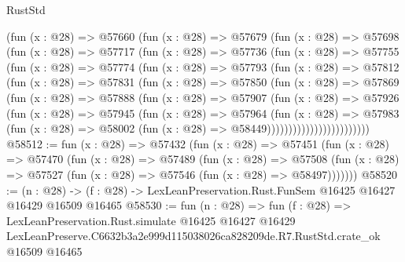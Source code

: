 \begin{lexlean}{RustStd}
\begin{coremodule}
            (fun (x : @28) =>
            @57660
              (fun (x : @28) =>
              @57679
                (fun (x : @28) =>
                @57698
                  (fun (x : @28) =>
                  @57717
                    (fun (x : @28) =>
                    @57736
                      (fun (x : @28) =>
                      @57755
                        (fun (x : @28) =>
                        @57774
                          (fun (x : @28) =>
                          @57793
                            (fun (x : @28) =>
                            @57812
                              (fun (x : @28) =>
                              @57831
                                (fun (x : @28) =>
                                @57850
                                  (fun (x : @28) =>
                                  @57869
                                    (fun (x : @28) =>
                                    @57888
                                      (fun (x : @28) =>
                                      @57907
                                        (fun (x : @28) =>
                                        @57926
                                          (fun (x : @28) =>
                                          @57945
                                            (fun (x : @28) =>
                                            @57964
                                              (fun (x : @28) =>
                                              @57983
                                                (fun (x : @28) =>
                                                @58002
                                                  (fun (x : @28) => @58449))))))))))))))))))))))))
@58512 := fun (x : @28) =>
  @57432
    (fun (x : @28) =>
    @57451
      (fun (x : @28) =>
      @57470
        (fun (x : @28) =>
        @57489
          (fun (x : @28) =>
          @57508 (fun (x : @28) => @57527 (fun (x : @28) => @57546 (fun (x : @28) => @58497)))))))
@58520 := (n : @28) ->
  (f : @28) -> LexLeanPreservation.Rust.FunSem @16425 @16427 @16429 @16509 @16465
@58530 := fun (n : @28) =>
  fun (f : @28) =>
  LexLeanPreservation.Rust.simulate
    @16425
    @16427
    @16429
    LexLeanPreserve.C6632b3a2e999d115038026ca828209de.R7.RustStd.crate_ok
    @16509
    @16465
\end{coremodule}
\end{lexlean}
